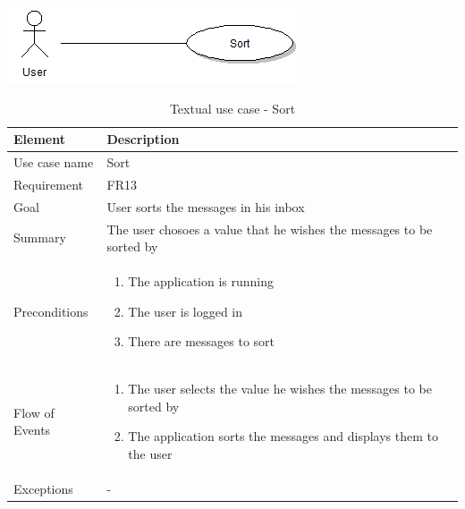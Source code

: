 \begin{table}
\begin{center}
\begin{center}
\includegraphics[width=\textwidth]{sort}
\end{center}
\begin{tabular}{p{3cm}|p{12cm}} \hline
\textbf{Element} & \textbf{Description} \\ \hline \hline
Use case name & Sort \\
Requirement & FR13 \\
Goal & User sorts the messages in his inbox \\ \hline
Summary & The user chosoes a value that he wishes the messages to be sorted by \\ \hline
Preconditions &
\begin{enumerate}
\item{}The application is running
\item{}The user is logged in
\item{}There are messages to sort
\end{enumerate} \\ \hline
Flow of Events &
\begin{enumerate}
\item{}The user selects the value he wishes the messages to be sorted by
\item{}The application sorts the messages and displays them to the user
\end{enumerate} \\ \hline
Exceptions & - \\ \hline
\end{tabular}
\end{center}
\caption{Textual use case - Sort} \label{tab:search}
\end{table}

